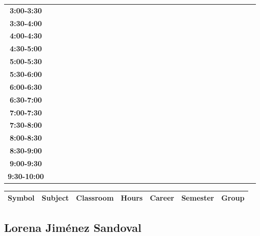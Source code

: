 \documentclass{article}
\begin{document}
\begin{table}[ht]
\begin{tabular}{|c|c|c|c|c|c|c|c|c|c|c|c|c|c|c|c|c|c|c|c|c|c|c|c|c|c|c|c|c|c|}
 \cline{1-8} 
\textbf{3:00-3:30} &   &   &   &   &   &   &   \\
 \cline{1-8} 
\textbf{3:30-4:00} &   &   &   &   &   &   &   \\
 \cline{1-8} 
\textbf{4:00-4:30} &   &   &   &   &   &   &   \\
 \cline{1-8} 
\textbf{4:30-5:00} &   &   &   &   &   &   &   \\
 \cline{1-8} 
\textbf{5:00-5:30} &   &   &   &   &   &   &   \\
 \cline{1-8} 
\textbf{5:30-6:00} &   &   &   &   &   &   &   \\
 \cline{1-8} 
\textbf{6:00-6:30} &   &   &   &   &   &   &   \\
 \cline{1-8} 
\textbf{6:30-7:00} &   &   &   &   &   &   &   \\
 \cline{1-8} 
\textbf{7:00-7:30} &   &   &   &   &   &   &   \\
 \cline{1-8} 
\textbf{7:30-8:00} &   &   &   &   &   &   &   \\
 \cline{1-8} 
\textbf{8:00-8:30} &   &   &   &   &   &   &   \\
 \cline{1-8} 
\textbf{8:30-9:00} &   &   &   &   &   &   &   \\
 \cline{1-8} 
\textbf{9:00-9:30} &   &   &   &   &   &   &   \\
 \cline{1-8} 
\textbf{9:30-10:00} &   &   &   &   &   &   &   \\
 \cline{1-8} 
\end{tabular}\end{table}

        
        \begin{tabular}{|>{\centering\arraybackslash}m{2cm}|>{\centering\arraybackslash}m{4cm}|>{\centering\arraybackslash}m{2cm}|>{\centering\arraybackslash}m{2cm}|>{\centering\arraybackslash}m{2cm}|>{\centering\arraybackslash}m{2cm}|>{\centering\arraybackslash}m{2cm}|}
        \hline
        \textbf{Symbol} & \textbf{Subject} & \textbf{Classroom} & \textbf{Hours} & \textbf{Career} & \textbf{Semester} & \textbf{Group} \\
        \hline
        \end{tabular}
                    

        \newpage
        

        \subsection{Lorena Jim\'enez Sandoval}
        \vspace*{.1cm}
        
\end{document}
